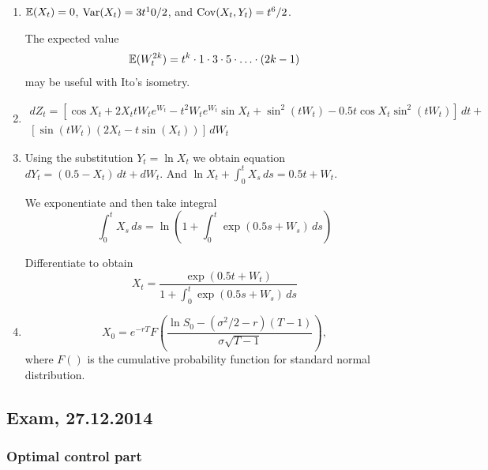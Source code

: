 \documentclass[pdftex,12pt,a4paper]{article}
\begin{document}
\begin{enumerate}
\item $\mathbb{E}(X_t)=0$, $\operatorname{Var}(X_t)=3t^10/2$, and $\operatorname{Cov}(X_t,Y_t)=t^6/2$.

The expected value 
\[
\mathbb{E}(W_t^{2k})=t^k\cdot 1\cdot 3 \cdot 5 \cdot \ldots \cdot (2k-1)
\]
may be useful with Ito's isometry.

\item 
\begin{multline}
dZ_t=[\cos X_t+2X_t t W_t e^{W_t}-t^2W_te^{W_t}\sin X_t + \sin^2(tW_t) - 0.5t\cos X_t \sin^2(tW_t)]\,dt + \\
[\sin(tW_t)(2X_t-t\sin(X_t))]\, dW_t
\end{multline}
\item Using the substitution $Y_t=\ln X_t$ we obtain equation $dY_t=(0.5-X_t) \, dt + dW_t$. And $\ln X_t + \int_0^t X_s \, ds = 0.5t+W_t$. 

We exponentiate and then take integral
\[
\int_0^t X_s \, ds=\ln \left( 1 + \int_0^t \exp(0.5s+W_s) \, ds \right)
\]

Differentiate to obtain 
\[
X_t=\frac{\exp(0.5t+W_t)}{1+\int_0^t \exp(0.5s+W_s) \, ds}
\]

\item 
\[
X_0=e^{-rT}F\left(  \frac{\ln S_0 - (\sigma^2/2-r)(T-1)}{\sigma \sqrt{T-1}} \right),
\]
where $F()$ is the cumulative probability function for standard normal distribution.

\end{enumerate}

\subsection{Exam, 27.12.2014}

\subsubsection*{Optimal control part}
\end{document}
